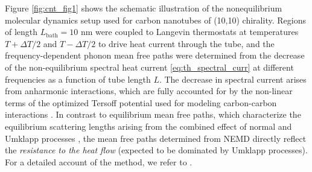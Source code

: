 Figure \ref{fig:cnt_fig1} shows the schematic illustration of the nonequilibrium molecular dynamics setup used for carbon nanotubes of (10,10) chirality. Regions of length $L_{\textrm{bath}}=10$ nm were coupled to Langevin thermostats at temperatures $T+\Delta T/2$ and $T-\Delta T/2$ to drive heat current through the tube, and the frequency-dependent phonon mean free paths were determined from the decrease of the non-equilibrium spectral heat current \eqref{eq:th_spectral_curr} at different frequencies as a function of tube length $L$. The decrease in spectral current arises from anharmonic interactions, which are fully accounted for by the non-linear terms of the optimized Tersoff potential used for modeling carbon-carbon interactions \cite{tersoff88a,lindsay10}. In contrast to equilibrium mean free paths, which characterize the equilibrium scattering lengths arising from the combined effect of normal and Umklapp processes \cite{mcgaughey04}, the mean free paths determined from NEMD directly reflect the \textit{resistance to the heat flow} (expected to be dominated by Umklapp processes). For a detailed account of the method, we refer to .


